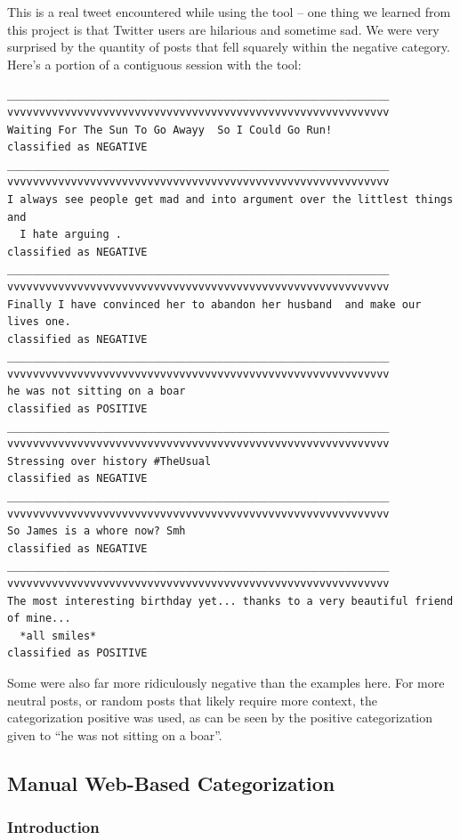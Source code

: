 \documentclass[12pt,a4paper]{article}
\begin{document}
This is a real tweet encountered while using the tool -- one thing we learned from this project is that Twitter users are hilarious and sometime sad.  We were very surprised by the quantity of posts that fell squarely within the negative category.  Here's a portion of a contiguous session with the tool:

\begin{verbatim}
____________________________________________________________
vvvvvvvvvvvvvvvvvvvvvvvvvvvvvvvvvvvvvvvvvvvvvvvvvvvvvvvvvvvv
Waiting For The Sun To Go Awayy  So I Could Go Run!
classified as NEGATIVE
____________________________________________________________
vvvvvvvvvvvvvvvvvvvvvvvvvvvvvvvvvvvvvvvvvvvvvvvvvvvvvvvvvvvv
I always see people get mad and into argument over the littlest things  and
  I hate arguing .
classified as NEGATIVE
____________________________________________________________
vvvvvvvvvvvvvvvvvvvvvvvvvvvvvvvvvvvvvvvvvvvvvvvvvvvvvvvvvvvv
Finally I have convinced her to abandon her husband  and make our lives one.
classified as NEGATIVE
____________________________________________________________
vvvvvvvvvvvvvvvvvvvvvvvvvvvvvvvvvvvvvvvvvvvvvvvvvvvvvvvvvvvv
he was not sitting on a boar
classified as POSITIVE
____________________________________________________________
vvvvvvvvvvvvvvvvvvvvvvvvvvvvvvvvvvvvvvvvvvvvvvvvvvvvvvvvvvvv
Stressing over history #TheUsual
classified as NEGATIVE
____________________________________________________________
vvvvvvvvvvvvvvvvvvvvvvvvvvvvvvvvvvvvvvvvvvvvvvvvvvvvvvvvvvvv
So James is a whore now? Smh
classified as NEGATIVE
____________________________________________________________
vvvvvvvvvvvvvvvvvvvvvvvvvvvvvvvvvvvvvvvvvvvvvvvvvvvvvvvvvvvv
The most interesting birthday yet... thanks to a very beautiful friend of mine...
  *all smiles*
classified as POSITIVE
\end{verbatim}

Some were also far more ridiculously negative than the examples here.  For more neutral posts, or random posts that likely require more context, the categorization positive was used, as can be seen by the positive categorization given to ``he was not sitting on a boar''.

\subsection { Manual Web-Based Categorization }

\subsubsection{Introduction}
\end{document}

